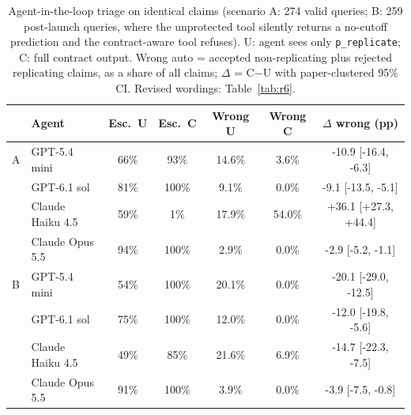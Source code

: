 \begin{table}[t]\centering\caption{Agent-in-the-loop triage on identical claims (scenario A: 274 valid queries; B: 259 post-launch queries, where the unprotected tool silently returns a no-cutoff prediction and the contract-aware tool refuses). U: agent sees only \textnormal{\texttt{p\_replicate}}; C: full contract output. Wrong auto = accepted non-replicating plus rejected replicating claims, as a share of all claims; $\Delta$ = C$-$U with paper-clustered 95\% CI. Revised wordings: Table~\ref{tab:r6}.}\label{tab:agent}
\scriptsize\setlength{\tabcolsep}{2pt}\begin{tabular}{@{}llccccc@{}}\toprule
& Agent & Esc.\ U & Esc.\ C & Wrong U & Wrong C & $\Delta$ wrong (pp) \\\midrule
A & GPT-5.4 mini & 66\% & 93\% & 14.6\% & 3.6\% & -10.9 [-16.4, -6.3] \\
 & GPT-6.1 sol & 81\% & 100\% & 9.1\% & 0.0\% & -9.1 [-13.5, -5.1] \\
 & Claude Haiku 4.5 & 59\% & 1\% & 17.9\% & 54.0\% & +36.1 [+27.3, +44.4] \\
 & Claude Opus 5.5 & 94\% & 100\% & 2.9\% & 0.0\% & -2.9 [-5.2, -1.1] \\
\midrule
B & GPT-5.4 mini & 54\% & 100\% & 20.1\% & 0.0\% & -20.1 [-29.0, -12.5] \\
 & GPT-6.1 sol & 75\% & 100\% & 12.0\% & 0.0\% & -12.0 [-19.8, -5.6] \\
 & Claude Haiku 4.5 & 49\% & 85\% & 21.6\% & 6.9\% & -14.7 [-22.3, -7.5] \\
 & Claude Opus 5.5 & 91\% & 100\% & 3.9\% & 0.0\% & -3.9 [-7.5, -0.8] \\
\bottomrule\end{tabular}\end{table}
